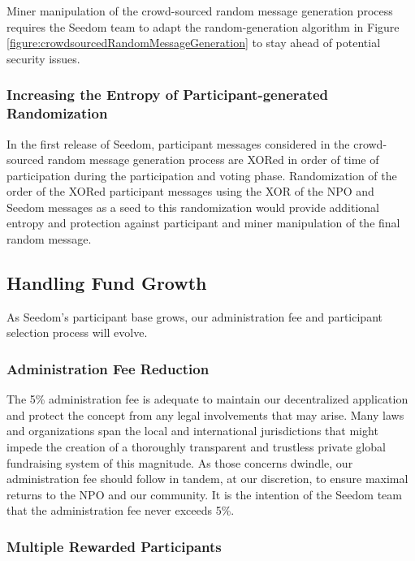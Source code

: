 \documentclass[11pt]{article}
\begin{document}
Miner manipulation of the crowd-sourced random message generation process requires the Seedom team to adapt the random-generation algorithm in Figure \ref{figure:crowdsourcedRandomMessageGeneration} to stay ahead of potential security issues.

\subsubsection{Increasing the Entropy of Participant-generated Randomization}
\label{sec:increasingTheEntropyOfParticipantGeneratedRandomization}

In the first release of Seedom, participant messages considered in the crowd-sourced random message generation process are XORed in order of time of participation during the participation and voting phase. Randomization of the order of the XORed participant messages using the XOR of the NPO and Seedom messages as a seed to this randomization would provide additional entropy and protection against participant and miner manipulation of the final random message.

\subsection{Handling Fund Growth}

As Seedom's participant base grows, our administration fee and participant selection process will evolve.

\subsubsection{Administration Fee Reduction}

The 5\% administration fee is adequate to maintain our decentralized application and protect the concept from any legal involvements that may arise. Many laws and organizations span the local and international jurisdictions that might impede the creation of a thoroughly transparent and trustless private global fundraising system of this magnitude. As those concerns dwindle, our administration fee should follow in tandem, at our discretion, to ensure maximal returns to the NPO and our community. It is the intention of the Seedom team that the administration fee never exceeds 5\%.

\subsubsection{Multiple Rewarded Participants}
\end{document}
